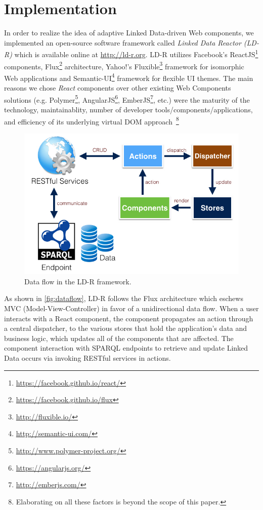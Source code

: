 \documentclass{acm_proc_article-sp}
\begin{document}
\section{Implementation}

In order to realize the idea of adaptive Linked Data-driven Web components, we implemented an open-source software framework called \emph{Linked Data Reactor (LD-R)} which is available online at \url{http://ld-r.org}.
LD-R utilizes Facebook's ReactJS\footnote{\url{https://facebook.github.io/react/}} components, Flux\footnote{\url{https://facebook.github.io/flux}} architecture, Yahoo!'s Fluxible\footnote{\url{http://fluxible.io/}} framework for isomorphic Web applications and Semantic-UI\footnote{\url{http://semantic-ui.com/}} framework for flexible UI themes.
The main reasons we chose \emph{React} components over other existing Web Components solutions (e.g. Polymer\footnote{\url{http://www.polymer-project.org/}}, AngularJS\footnote{\url{https://angularjs.org/}}, EmberJS\footnote{\url{http://emberjs.com/}}, etc.) were the maturity of the technology, maintainablity, number of developer tools/components/applications, and efficiency of its underlying virtual DOM approach~\footnote{Elaborating on all these factors is beyond the scope of this paper.}

\begin{figure}[tb]
  \includegraphics[width=.9\linewidth]{images/dataflow.jpg}
  \caption{Data flow in the LD-R framework.}
  \label{fig:dataflow}
\end{figure}

As shown in \autoref{fig:dataflow}, LD-R follows the Flux architecture which eschews MVC (Model-View-Controller) in favor of a unidirectional data flow. 
When a user interacts with a React component, the component propagates an action through a central dispatcher, to the various stores that hold the application's data and business logic, which updates all of the components that are affected. 
The component interaction with SPARQL endpoints to retrieve and update Linked Data occurs via invoking RESTful services in actions.
\end{document}
